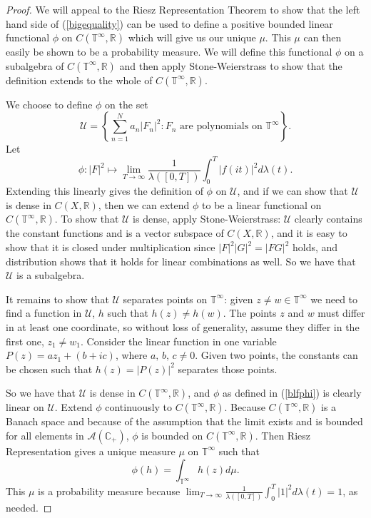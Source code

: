 \documentclass[]{elsarticle}
\newcommand{\R}{\mathbb{R}}
\newcommand{\T}{\mathbb{T}}
\newcommand{\cA}{\mathcal{A}}
\newcommand{\cU}{\mathcal{U}}
\newcommand{\cplus}{\mathbb{C}_{+}}
\numberwithin{equation}{section}
\begin{document}
      \begin{proof}
        We will appeal to the Riesz Representation Theorem to show that the left hand side of (\ref{bigequality}) can be used to define a positive bounded linear functional $\phi$ on $C(\T^{\infty},\R)$ which will give us our unique $\mu$. This $\mu$ can then easily be shown to be a probability measure. We will define this functional $\phi$ on a subalgebra of $C(\T^{\infty},\R)$ and then apply Stone-Weierstrass to show that the definition extends to the whole of $C(\T^{\infty},\R)$.

        We choose to define $\phi$ on the set 
        \begin{equation*}
          \cU = \left\{\sum_{n=1}^N a_n |F_n|^2: F_n \text{ are polynomials on } {\T^{\infty}}\right\}.
        \end{equation*}
        Let
        \begin{equation} \label{blfphi}
          \phi: |F|^2 \mapsto \lim_{T \to \infty} \frac{1}{\lambda([0,T])} \int_{0}^{T}\left|f(it)\right|^2 d\lambda(t).
        \end{equation} 
        Extending this linearly gives the definition of $\phi$ on $\cU$, and if we can show that $\cU$ is dense in $C(X,\R)$, then we can extend $\phi$ to be a linear functional on $C(\T^{\infty},\R)$. 
        To show that $\cU$ is dense, apply Stone-Weierstrass: $\cU$ clearly contains the constant functions and is a vector subspace of $C(X,\R)$, and it is easy to show that it is closed under multiplication since $|F|^2|G|^2 = |FG|^2$ holds, and distribution shows that it holds for linear combinations as well. So we have that $\cU$ is a subalgebra. 

        It remains to show that $\cU$ separates points on $\T^{\infty}$: given $z\neq w\in \T^{\infty}$ we need to find a function in $\cU$, $h$ such that $h(z)\neq h(w)$. The points $z$ and $w$ must differ in at least one coordinate, so without loss of generality, assume they differ in the first one, $z_1 \neq w_1$. Consider the linear function in one variable $P(z) = az_1 + (b+ic)$, where $a,\,b,\,c \neq 0$. Given two points, the constants can be chosen such that $h(z)=|P(z)|^2$ separates those points. 

        So we have that $\cU$ is dense in $C(\T^{\infty}, \R)$, and $\phi$ as defined in (\ref{blfphi}) is clearly linear on $\cU$. Extend $\phi$ continuously to $C(\T^{\infty}, \R)$. Because $C(\T^{\infty}, \R)$ is a Banach space and because of the assumption that the limit exists and is bounded for all elements in $\cA(\cplus)$, $\phi$ is bounded on $C(\T^{\infty}, \R)$. Then Riesz Representation gives a unique measure $\mu$ on $\T^{\infty}$ such that
        \begin{equation*}
          \phi(h) = \int_{\T^{\infty}} h(z) d\mu.
        \end{equation*}
        This $\mu$ is a probability measure because $\lim_{T \to \infty} \frac{1}{\lambda([0,T])} \int_{0}^{T}\left|1\right|^2 d\lambda(t) = 1$, as needed.
      \end{proof}
\end{document}
